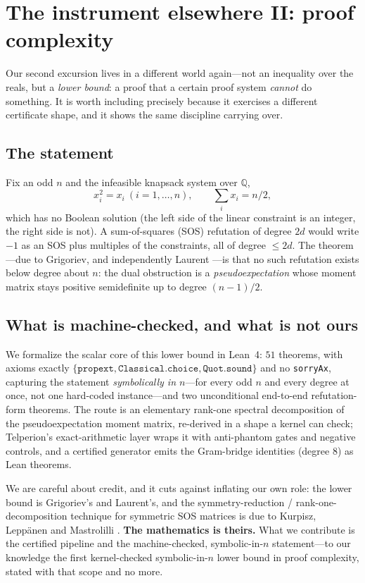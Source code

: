 \section{The instrument elsewhere II: proof complexity}
\label{sec:pc}

Our second excursion lives in a different world again---not an inequality over the
reals, but a \emph{lower bound}: a proof that a certain proof system \emph{cannot}
do something. It is worth including precisely because it exercises a different
certificate shape, and it shows the same discipline carrying over.

\subsection{The statement}

Fix an odd $n$ and the infeasible knapsack system over $\mathbb{Q}$,
\[
  x_i^2 = x_i \ (i = 1, \dots, n), \qquad \textstyle\sum_i x_i = n/2,
\]
which has no Boolean solution (the left side of the linear constraint is an
integer, the right side is not). A sum-of-squares (SOS) refutation of degree $2d$
would write $-1$ as an SOS plus multiples of the constraints, all of degree
$\le 2d$. The theorem---due to Grigoriev, and independently Laurent
\cite{grigoriev2001}---is that no such refutation exists below degree about $n$:
the dual obstruction is a \emph{pseudoexpectation} whose moment matrix stays
positive semidefinite up to degree $(n-1)/2$.

\subsection{What is machine-checked, and what is not ours}

We formalize the scalar core of this lower bound in Lean~4: $51$ theorems, with
axioms exactly $\{\texttt{propext}, \texttt{Classical.choice}, \texttt{Quot.sound}\}$
and no \texttt{sorryAx}, capturing the statement \emph{symbolically in $n$}---for
every odd $n$ and every degree at once, not one hard-coded instance---and two
unconditional end-to-end refutation-form theorems. The route is an elementary
rank-one spectral decomposition of the pseudoexpectation moment matrix, re-derived
in a shape a kernel can check; Telperion's exact-arithmetic layer wraps it with
anti-phantom gates and negative controls, and a certified generator emits the
Gram-bridge identities (degree $8$) as Lean theorems.

We are careful about credit, and it cuts against inflating our own role: the
lower bound is Grigoriev's and Laurent's, and the symmetry-reduction /
rank-one-decomposition technique for symmetric SOS matrices is due to Kurpisz,
Lepp\"anen and Mastrolilli \cite{klm2016}. \textbf{The mathematics is theirs.} What
we contribute is the certified pipeline and the machine-checked, symbolic-in-$n$
statement---to our knowledge the first kernel-checked symbolic-in-$n$ lower bound
in proof complexity, stated with that scope and no more.

